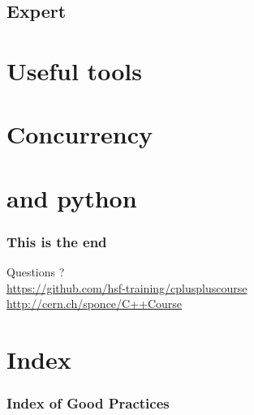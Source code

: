 \documentclass[compress]{beamer}
\begin{document}

\begin{advanced}
  
  
\end{advanced}



\begin{advanced}
  
  
  
\end{advanced}

\begin{advanced}
  
\end{advanced}

\begin{advanced}
  \section[exp]{Expert \cpp}
  
  
  
  
  
  
  
\end{advanced}

\section[Tool]{Useful tools}






\begin{advanced}
  
  
  
  
  

  \section[conc]{Concurrency}
  
  
  
  

  \section[py]{\cpp and python}
  
  
  
  
\end{advanced}

\begin{frame}
  \frametitle{This is the end}
  \begin{center}
    \Huge Questions ?\\
    \vspace{.5cm}
    \tiny \href{https://github.com/hsf-training/cpluspluscourse}{https://github.com/hsf-training/cpluspluscourse}\\
    \tiny \href{http://cern.ch/sponce/C++Course}{http://cern.ch/sponce/C++Course}
  \end{center}
\end{frame}

\section*{Index}

\begin{frame}
  \frametitle{Index of Good Practices}
  \listofgoodpractices
\end{frame}
\end{document}
